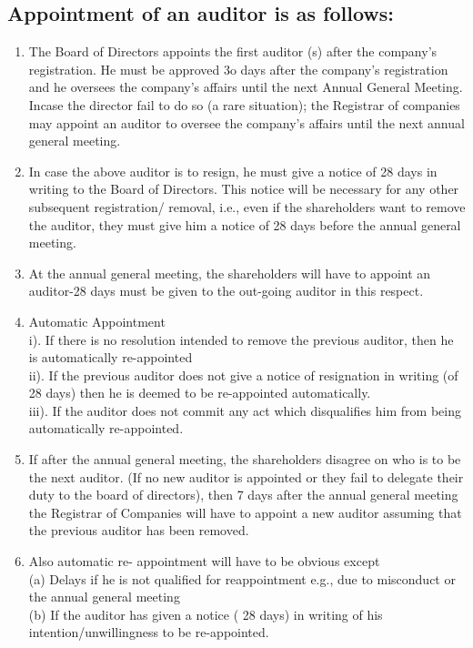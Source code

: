 \documentclass[10pt]{article}
\begin{document}
\subsection*{Appointment of an auditor is as follows:}
\begin{enumerate}
  \item The Board of Directors appoints the first auditor (s) after the company's registration. He must be approved 3o days after the company's registration and he oversees the company's affairs until the next Annual General Meeting. Incase the director fail to do so (a rare situation); the Registrar of companies may appoint an auditor to oversee the company's affairs until the next annual general meeting.
  \item In case the above auditor is to resign, he must give a notice of 28 days in writing to the Board of Directors. This notice will be necessary for any other subsequent registration/ removal, i.e., even if the shareholders want to remove the auditor, they must give him a notice of 28 days before the annual general meeting.
  \item At the annual general meeting, the shareholders will have to appoint an auditor-28 days must be given to the out-going auditor in this respect.
  \item Automatic Appointment\\
i). If there is no resolution intended to remove the previous auditor, then he is automatically re-appointed\\
ii). If the previous auditor does not give a notice of resignation in writing (of 28 days) then he is deemed to be re-appointed automatically.\\
iii). If the auditor does not commit any act which disqualifies him from being automatically re-appointed.
  \item If after the annual general meeting, the shareholders disagree on who is to be the next auditor. (If no new auditor is appointed or they fail to delegate their duty to the board of directors), then 7 days after the annual general meeting the Registrar of Companies will have to appoint a new auditor assuming that the previous auditor has been removed.
  \item Also automatic re- appointment will have to be obvious except\\
(a) Delays if he is not qualified for reappointment e.g., due to misconduct or the annual general meeting\\
(b) If the auditor has given a notice ( 28 days) in writing of his intention/unwillingness to be re-appointed.\\

\end{enumerate}
\end{document}
